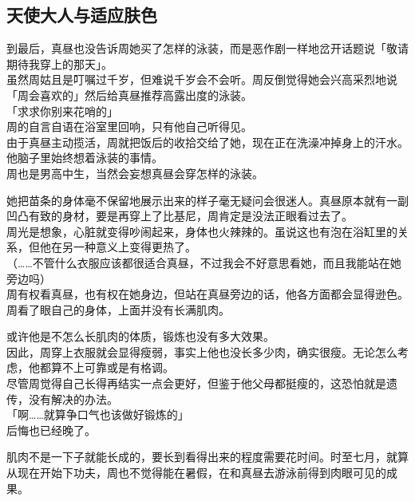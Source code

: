 \subsection{天使大人与适应肤色}

到最后，真昼也没告诉周她买了怎样的泳装，而是恶作剧一样地岔开话题说「敬请期待我穿上的那天」。\\

虽然周姑且是叮嘱过千岁，但难说千岁会不会听。周反倒觉得她会兴高采烈地说「周会喜欢的」然后给真昼推荐高露出度的泳装。\\

「求求你别来花哨的」\\

周的自言自语在浴室里回响，只有他自己听得见。\\

由于真昼主动揽活，周就把饭后的收拾交给了她，现在正在洗澡冲掉身上的汗水。他脑子里始终想着泳装的事情。\\

周也是男高中生，当然会妄想真昼会穿怎样的泳装。

她把苗条的身体毫不保留地展示出来的样子毫无疑问会很迷人。真昼原本就有一副凹凸有致的身材，要是再穿上了比基尼，周肯定是没法正眼看过去了。\\

周光是想象，心脏就变得吵闹起来，身体也火辣辣的。虽说这也有泡在浴缸里的关系，但他在另一种意义上变得更热了。\\

（……不管什么衣服应该都很适合真昼，不过我会不好意思看她，而且我能站在她旁边吗）\\

周有权看真昼，也有权在她身边，但站在真昼旁边的话，他各方面都会显得逊色。\\

周看了眼自己的身体，上面并没有长满肌肉。

或许他是不怎么长肌肉的体质，锻炼也没有多大效果。\\

因此，周穿上衣服就会显得瘦弱，事实上他也没长多少肉，确实很瘦。无论怎么考虑，他都算不上可靠或是有格调。\\

尽管周觉得自己长得再结实一点会更好，但鉴于他父母都挺瘦的，这恐怕就是遗传，没有解决的办法。\\

「啊……就算争口气也该做好锻炼的」\\

后悔也已经晚了。

肌肉不是一下子就能长成的，要长到看得出来的程度需要花时间。时至七月，就算从现在开始下功夫，周也不觉得能在暑假，在和真昼去游泳前得到肉眼可见的成果。\\

